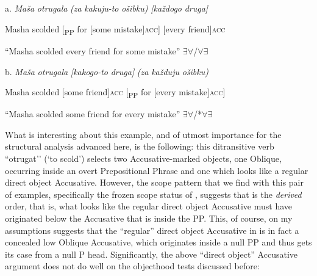 \documentclass[output=paper,modfonts, nonflat]{langsci/langscibook}
\begin{document}
\begin{styleinnerExample}
\ea%
    \label{ex:key:54}
    \gll\\
        \\
    \glt
    \z

          a.  \textit{Maša}   \textit{otrugala}    \textit{(za}  \textit{kakuju-to} \textit{ošibku)}          \textit{[každogo} \textit{druga]}
\end{styleinnerExample}

\begin{styleinnerExample}
    Masha scolded [\textsubscript{PP} for [some       mistake]\textsc{acc}] [every    friend]\textsc{acc~}
\end{styleinnerExample}

\begin{styleinnerExample}
    “Masha scolded every friend for some mistake” ${\exists}{\forall}$/${\forall}{\exists}$\\\end{styleinnerExample}

\begin{styleinnerExample}
  b.  \textit{Maša}   \textit{otrugala} \textit{[kakogo-to} \textit{druga]}            \textit{(za}  \textit{každuju}  \textit{ošibku)}
\end{styleinnerExample}

\begin{styleinnerExample}
    Masha scolded  [some         friend]\textsc{acc} [\textsubscript{PP} for [every     mistake]\textsc{acc}]
\end{styleinnerExample}

\begin{styleinnerExample}
    “Masha scolded some friend for every mistake” ${\exists}{\forall}$/*${\forall}{\exists}$
\end{styleinnerExample}

What is interesting about this example, and of utmost importance for the structural analysis advanced here, is the following: this ditransitive verb “otrugat’’ (‘to scold’) selects two Accusative-marked objects, one Oblique, occurring inside an overt Prepositional Phrase and one which looks like a regular direct object Accusative. However, the scope pattern that we find with this pair of examples, specifically the frozen scope status of , suggests that  is the \textit{derived} order, that is, what looks like the regular direct object Accusative must have originated below the Accusative that is inside the PP. This, of course, on my assumptions suggests that the “regular” direct object Accusative in  is in fact a concealed low Oblique Accusative, which originates inside a null PP and thus gets its case from a null P head. Significantly, the above “direct object” Accusative argument does not do well on the objecthood tests discussed before:
\end{document}
